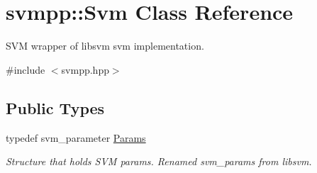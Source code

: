 \hypertarget{classsvmpp_1_1Svm}{}\section{svmpp\+:\+:Svm Class Reference}
\label{classsvmpp_1_1Svm}


S\+VM wrapper of libsvm svm implementation.  




{\ttfamily \#include $<$svmpp.\+hpp$>$}

\subsection*{Public Types}
\begin{DoxyCompactItemize}
\item 
typedef svm\+\_\+parameter \hyperlink{classsvmpp_1_1Svm_a5ec13b8f62c2deb4b4229a2305c32c03}{Params}\hypertarget{classsvmpp_1_1Svm_a5ec13b8f62c2deb4b4229a2305c32c03}{}\label{classsvmpp_1_1Svm_a5ec13b8f62c2deb4b4229a2305c32c03}

\begin{DoxyCompactList}\small\item\em Structure that holds S\+VM params. Renamed svm\+\_\+params from libsvm. \end{DoxyCompactList}\end{DoxyCompactItemize}
